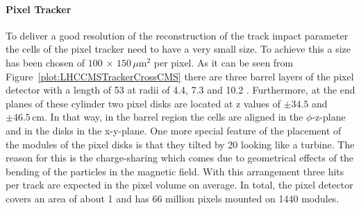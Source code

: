 \paragraph{Pixel Tracker}
To deliver a good resolution of the reconstruction of the track impact parameter the cells of the pixel tracker need to have a very small size. To achieve this a size has been chosen of $\text{100}\,\times\,\text{150}\,\mu\text{m}^{\text{2}}$ per pixel. As it can be seen from Figure~\ref{plot:LHCCMSTrackerCrossCMS} there are three barrel layers of the pixel detector with a length of 53\cm{} at radii of 4.4, 7.3 and 10.2 \cm{}. Furthermore, at the end planes of these cylinder two pixel disks are located at z values of $\pm{}34.5$ and $\pm{}46.5\,\text{cm}$. In that way, in the barrel region the cells are aligned in the $\phi{}$-z-plane and in the disks in the x-y-plane. One more special feature of the placement of the modules of the pixel disks is that they tilted by 20\de{} looking like a turbine. The reason for this is the charge-sharing which comes due to geometrical effects of the bending of the particles in the magnetic field.  With this arrangement three hits per track are expected in the pixel volume on average. In total, the pixel detector covers an area of about 1\ms{} and has 66 million pixels mounted on 1440 modules.


